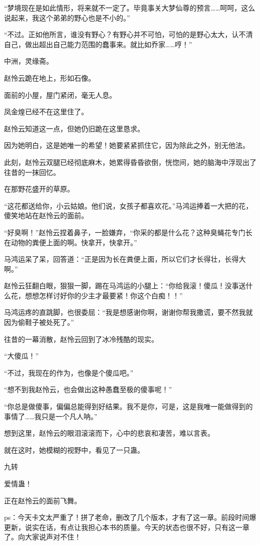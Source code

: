 \begin{this_body}
“梦境现在是如此情形，将来就不一定了。毕竟事关大梦仙尊的预言……呵呵，这么说起来，我这个弟弟的野心也是不小的。”

“不过。正如他所言，谁没有野心？有野心并不可怕，可怕的是野心太大，认不清自己，做出超出自己能力范围的蠢事来。就比如乔家……哼！”

中洲，灵缘斋。

赵怜云跪在地上，形如石像。

面前的小屋，屋门紧闭，毫无人息。

凤金煌已经不在这里住了。

赵怜云知道这一点，但她仍旧跪在这里恳求。

因为她明白，这是她唯一的希望！她要紧紧抓住它，因为除此之外，别无他法。

此刻，赵怜云双腿已经彻底麻木，她累得昏昏欲倒，恍惚间，她的脑海中浮现出了往昔的一抹回忆。

在那野花盛开的草原。

“这花都送给你，小云姑娘。他们说，女孩子都喜欢花。”马鸿运捧着一大把的花，傻笑地站在赵怜云的面前。

“好臭啊！”赵怜云捏着鼻子，一脸嫌弃，“你采的都是什么花？这种臭蝇花专门长在动物的粪便上面的啊。快拿开，快拿开。”

马鸿运呆了呆，回答道：“正是因为长在粪便上面，所以它们才长得壮，长得大啊。”

赵怜云狂翻白眼，狠狠一脚，踢在马鸿运的小腿上：“你给我滚！傻瓜！没事送什么花，想想怎样讨好你的少主才最要紧！你这个白痴！！”

马鸿运疼的直跳脚，也很委屈：“我是想感谢你啊，谢谢你帮我撒谎，要不然我就因为偷鞋子被处死了。”

往昔的一幕消散，赵怜云回到了冰冷残酷的现实。

“大傻瓜！”

“不过，我现在的作为，也像是个傻瓜吧。”

“想不到我赵怜云，也会做出这种愚蠢至极的傻事呢！”

“你总是做傻事，偏偏总能得到好结果。我不是你，可是，这是我唯一能做得到的事情了……我只是一个凡人呐。”

想到这里，赵怜云的眼泪滚滚而下，心中的悲哀和凄苦，难以言表。

就在这时，她模糊的视野中，看见了一只蛊。

九转

爱情蛊！

正在赵怜云的面前飞舞。

ps：今天卡文太严重了！拼了老命，删改了几个版本，才有了这一章。前段时间爆更新，说实在话，有点让我担心本书的质量。今天的状态也很不好，只有这一章了。向大家说声对不住！

\end{this_body}

